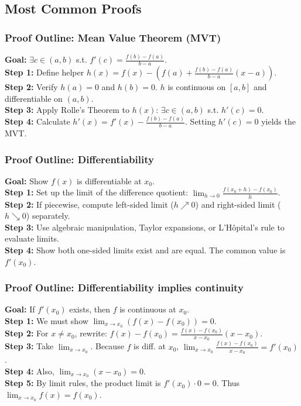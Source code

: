 \subsection{Most Common Proofs}

\subsubsection{Proof Outline: Mean Value Theorem (MVT)}
\textbf{Goal:} $\exists c \in (a,b)$ s.t. $f'(c) = \frac{f(b)-f(a)}{b-a}$. \\
\textbf{Step 1:} Define helper $h(x) = f(x) - \left( f(a) + \frac{f(b)-f(a)}{b-a}(x-a) \right)$. \\
\textbf{Step 2:} Verify $h(a) = 0$ and $h(b) = 0$. $h$ is continuous on $[a,b]$ and differentiable on $(a,b)$. \\
\textbf{Step 3:} Apply Rolle's Theorem to $h(x)$: $\exists c \in (a,b)$ s.t. $h'(c) = 0$. \\
\textbf{Step 4:} Calculate $h'(x) = f'(x) - \frac{f(b)-f(a)}{b-a}$. Setting $h'(c) = 0$ yields the MVT.

\subsubsection{Proof Outline: Differentiability}
\textbf{Goal:} Show $f(x)$ is differentiable at $x_0$. \\
\textbf{Step 1:} Set up the limit of the difference quotient: $\lim_{h \to 0} \frac{f(x_0+h)-f(x_0)}{h}$. \\
\textbf{Step 2:} If piecewise, compute left-sided limit ($h \nearrow 0$) and right-sided limit ($h \searrow 0$) separately. \\
\textbf{Step 3:} Use algebraic manipulation, Taylor expansions, or L'Hôpital's rule to evaluate limits. \\
\textbf{Step 4:} Show both one-sided limits exist and are equal. The common value is $f'(x_0)$.

\subsubsection{Proof Outline: Differentiability implies continuity}
\textbf{Goal:} If $f'(x_0)$ exists, then $f$ is continuous at $x_0$. \\
\textbf{Step 1:} We must show $\lim_{x \to x_0} (f(x) - f(x_0)) = 0$. \\
\textbf{Step 2:} For $x \neq x_0$, rewrite: $f(x) - f(x_0) = \frac{f(x) - f(x_0)}{x - x_0} (x - x_0)$. \\
\textbf{Step 3:} Take $\lim_{x \to x_0}$. Because $f$ is diff. at $x_0$, $\lim_{x \to x_0} \frac{f(x) - f(x_0)}{x - x_0} = f'(x_0)$. \\
\textbf{Step 4:} Also, $\lim_{x \to x_0} (x - x_0) = 0$. \\
\textbf{Step 5:} By limit rules, the product limit is $f'(x_0) \cdot 0 = 0$. Thus $\lim_{x \to x_0} f(x) = f(x_0)$.

